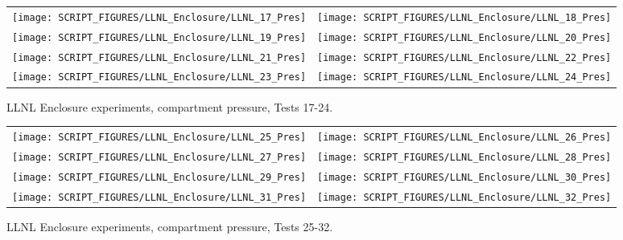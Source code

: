 \begin{figure}[p]
\begin{tabular*}{\textwidth}{l@{\extracolsep{\fill}}r}
\texttt{[image: SCRIPT\_FIGURES/LLNL\_Enclosure/LLNL\_17\_Pres]} &
\texttt{[image: SCRIPT\_FIGURES/LLNL\_Enclosure/LLNL\_18\_Pres]} \\
\texttt{[image: SCRIPT\_FIGURES/LLNL\_Enclosure/LLNL\_19\_Pres]} &
\texttt{[image: SCRIPT\_FIGURES/LLNL\_Enclosure/LLNL\_20\_Pres]} \\
\texttt{[image: SCRIPT\_FIGURES/LLNL\_Enclosure/LLNL\_21\_Pres]} &
\texttt{[image: SCRIPT\_FIGURES/LLNL\_Enclosure/LLNL\_22\_Pres]} \\
\texttt{[image: SCRIPT\_FIGURES/LLNL\_Enclosure/LLNL\_23\_Pres]} &
\texttt{[image: SCRIPT\_FIGURES/LLNL\_Enclosure/LLNL\_24\_Pres]}
\end{tabular*}
\caption[LLNL Enclosure experiments, compartment pressure, Tests 17-24]{LLNL Enclosure experiments, compartment pressure, Tests 17-24.}
\label{LLNL_Enclosure_Pres_3}
\end{figure}

\begin{figure}[p]
\begin{tabular*}{\textwidth}{l@{\extracolsep{\fill}}r}
\texttt{[image: SCRIPT\_FIGURES/LLNL\_Enclosure/LLNL\_25\_Pres]} &
\texttt{[image: SCRIPT\_FIGURES/LLNL\_Enclosure/LLNL\_26\_Pres]} \\
\texttt{[image: SCRIPT\_FIGURES/LLNL\_Enclosure/LLNL\_27\_Pres]} &
\texttt{[image: SCRIPT\_FIGURES/LLNL\_Enclosure/LLNL\_28\_Pres]} \\
\texttt{[image: SCRIPT\_FIGURES/LLNL\_Enclosure/LLNL\_29\_Pres]} &
\texttt{[image: SCRIPT\_FIGURES/LLNL\_Enclosure/LLNL\_30\_Pres]} \\
\texttt{[image: SCRIPT\_FIGURES/LLNL\_Enclosure/LLNL\_31\_Pres]} &
\texttt{[image: SCRIPT\_FIGURES/LLNL\_Enclosure/LLNL\_32\_Pres]}
\end{tabular*}
\caption[LLNL Enclosure experiments, compartment pressure, Tests 25-32]{LLNL Enclosure experiments, compartment pressure, Tests 25-32.}
\label{LLNL_Enclosure_Pres_4}
\end{figure}

